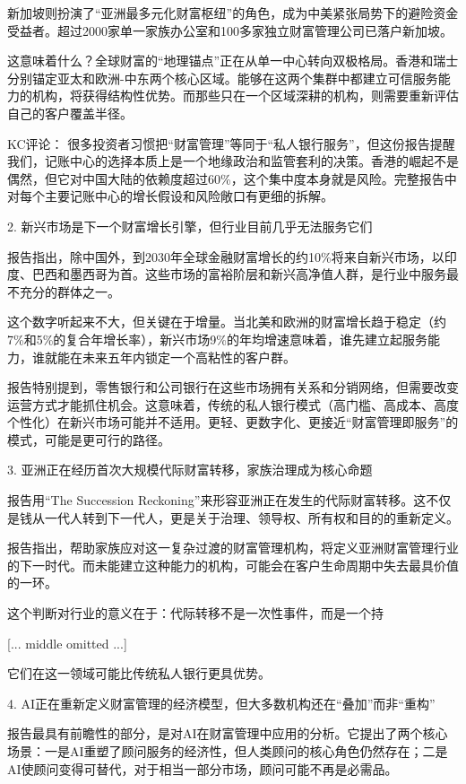 \documentclass[11pt]{ctexart}
\begin{document}
新加坡则扮演了“亚洲最多元化财富枢纽”的角色，成为中美紧张局势下的避险资金受益者。超过2000家单一家族办公室和100多家独立财富管理公司已落户新加坡。

这意味着什么？全球财富的“地理锚点”正在从单一中心转向双极格局。香港和瑞士分别锚定亚太和欧洲-中东两个核心区域。能够在这两个集群中都建立可信服务能力的机构，将获得结构性优势。而那些只在一个区域深耕的机构，则需要重新评估自己的客户覆盖半径。

KC评论： 很多投资者习惯把“财富管理”等同于“私人银行服务”，但这份报告提醒我们，记账中心的选择本质上是一个地缘政治和监管套利的决策。香港的崛起不是偶然，但它对中国大陆的依赖度超过60\%，这个集中度本身就是风险。完整报告中对每个主要记账中心的增长假设和风险敞口有更细的拆解。

2. 新兴市场是下一个财富增长引擎，但行业目前几乎无法服务它们

报告指出，除中国外，到2030年全球金融财富增长的约10\%将来自新兴市场，以印度、巴西和墨西哥为首。这些市场的富裕阶层和新兴高净值人群，是行业中服务最不充分的群体之一。

这个数字听起来不大，但关键在于增量。当北美和欧洲的财富增长趋于稳定（约7\%和5\%的复合年增长率），新兴市场9\%的年均增速意味着，谁先建立起服务能力，谁就能在未来五年内锁定一个高粘性的客户群。

报告特别提到，零售银行和公司银行在这些市场拥有关系和分销网络，但需要改变运营方式才能抓住机会。这意味着，传统的私人银行模式（高门槛、高成本、高度个性化）在新兴市场可能并不适用。更轻、更数字化、更接近“财富管理即服务”的模式，可能是更可行的路径。

3. 亚洲正在经历首次大规模代际财富转移，家族治理成为核心命题

报告用“The Succession Reckoning”来形容亚洲正在发生的代际财富转移。这不仅是钱从一代人转到下一代人，更是关于治理、领导权、所有权和目的的重新定义。

报告指出，帮助家族应对这一复杂过渡的财富管理机构，将定义亚洲财富管理行业的下一时代。而未能建立这种能力的机构，可能会在客户生命周期中失去最具价值的一环。

这个判断对行业的意义在于：代际转移不是一次性事件，而是一个持

[... middle omitted ...]

它们在这一领域可能比传统私人银行更具优势。

4. AI正在重新定义财富管理的经济模型，但大多数机构还在“叠加”而非“重构”

报告最具有前瞻性的部分，是对AI在财富管理中应用的分析。它提出了两个核心场景：一是AI重塑了顾问服务的经济性，但人类顾问的核心角色仍然存在；二是AI使顾问变得可替代，对于相当一部分市场，顾问可能不再是必需品。
\end{document}

